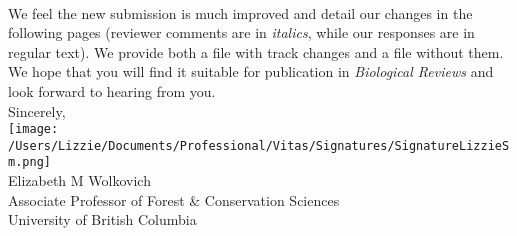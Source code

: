 \documentclass[11pt,a4paper]{letter}
\begin{document}
\begin{letter}{}
\vspace{1.5ex}\\
We feel the new submission is much improved and detail our changes in the following pages (reviewer comments are in \emph{italics}, while our responses are in regular text). We provide both a file with track changes and a file without them. We hope that you will find it suitable for publication in \emph{Biological Reviews} and look forward to hearing from you.
\vspace{1.5ex}\\
Sincerely,\\
\texttt{[image: /Users/Lizzie/Documents/Professional/Vitas/Signatures/SignatureLizzieSm.png]} \\
Elizabeth M Wolkovich\\
Associate Professor of Forest \& Conservation Sciences\\ 
University of British Columbia
\end{letter}
\end{document}
